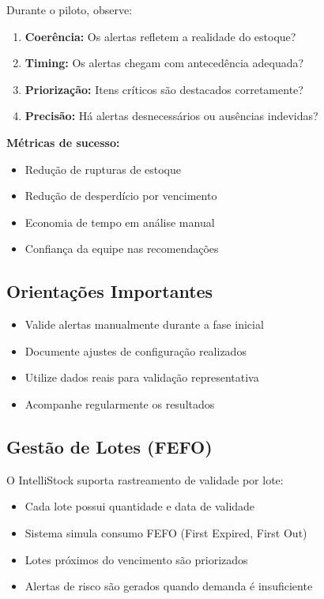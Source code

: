 Durante o piloto, observe:

\begin{enumerate}[leftmargin=2em]
  \item \textbf{Coerência:} Os alertas refletem a realidade do estoque?
  \item \textbf{Timing:} Os alertas chegam com antecedência adequada?
  \item \textbf{Priorização:} Itens críticos são destacados corretamente?
  \item \textbf{Precisão:} Há alertas desnecessários ou ausências indevidas?
\end{enumerate}

\textbf{Métricas de sucesso:}

\begin{itemize}[leftmargin=2em]
  \item Redução de rupturas de estoque
  \item Redução de desperdício por vencimento
  \item Economia de tempo em análise manual
  \item Confiança da equipe nas recomendações
\end{itemize}

\subsection{Orientações Importantes}

\begin{itemize}[leftmargin=2em]
  \item Valide alertas manualmente durante a fase inicial
  \item Documente ajustes de configuração realizados
  \item Utilize dados reais para validação representativa
  \item Acompanhe regularmente os resultados
\end{itemize}

\subsection{Gestão de Lotes (FEFO)}

O IntelliStock suporta rastreamento de validade por lote:

\begin{itemize}[leftmargin=2em]
  \item Cada lote possui quantidade e data de validade
  \item Sistema simula consumo FEFO (First Expired, First Out)
  \item Lotes próximos do vencimento são priorizados
  \item Alertas de risco são gerados quando demanda é insuficiente
\end{itemize}

